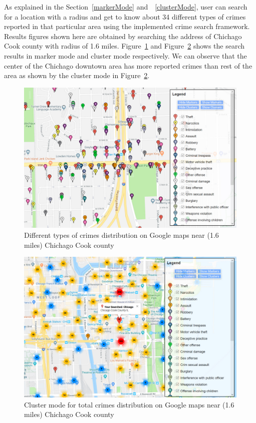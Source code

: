 As explained in the Section~\ref{markerMode} and~~\ref{clusterMode},
user can search for a location with a radius and get to know about 34
different types of crimes reported in that particular area using the
implemented crime search framework. Results figures shown here are
obtained by searching the address of Chichago Cook county with radius
of 1.6 miles. Figure~\ref{fig:time-totalCrime-geo1} and
Figure~\ref{fig:time-top10crimes-local-geo2} shows the search results
in marker mode and cluster mode respectively. We can observe that the
center of the Chichago downtown area has more reported crimes than
rest of the area as shown by the cluster mode in
Figure~\ref{fig:time-top10crimes-local-geo2}.

\begin{figure}[htb]
	\centering\includegraphics[width=\columnwidth]{images/geo1.jpg}
	\caption{Different types of crimes distribution on Google
        maps near (1.6 miles) Chichago Cook
        county}\label{fig:time-totalCrime-geo1}
\end{figure}

\begin{figure}[htb]
	\centering\includegraphics[width=\columnwidth]{images/geo2.jpg}
	\caption{Cluster mode for total crimes distribution on Google
        maps near (1.6 miles) Chichago Cook
        county}\label{fig:time-top10crimes-local-geo2}
\end{figure}

